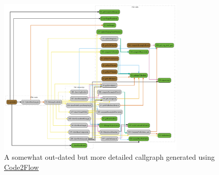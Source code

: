 \documentclass[12pt, titlepage]{article}
\begin{document}
\begin{figure}[h!]
  \begin{center}
   \includegraphics[width=0.8\textwidth]{callgraph/old-complex.png}
  \caption{A somewhat out-dated but more detailed callgraph generated using \href{https://github.com/scottrogowski/code2flow}{Code2Flow}}
  \label{fig_callgraph_old_full} 
  \end{center}
\end{figure}

\newpage
\clearpage



\end{document}
